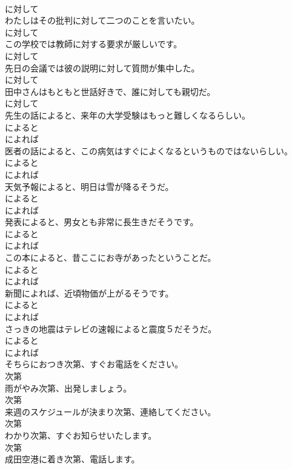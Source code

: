 \documentclass[8pt]{extreport}
\begin{document}
\begin{CJK}{UTF8}{min}
\\	に対して
\\	わたしはその批判に対して二つのことを言いたい。	
\\	に対して
\\	この学校では教師に対する要求が厳しいです。	
\\	に対して
\\	先日の会議では彼の説明に対して質問が集中した。	
\\	に対して
\\	田中さんはもともと世話好きで、誰に対しても親切だ。	
\\	に対して
\\	先生の話によると、来年の大学受験はもっと難しくなるらしい。	
\\	によると 
\\	によれば
\\	医者の話によると、この病気はすぐによくなるというものではないらしい。	
\\	によると 
\\	によれば
\\	天気予報によると、明日は雪が降るそうだ。	
\\	によると 
\\	によれば
\\	発表によると、男女とも非常に長生きだそうです。	
\\	によると 
\\	によれば
\\	この本によると、昔ここにお寺があったということだ。	
\\	によると 
\\	によれば
\\	新聞によれば、近頃物価が上がるそうです。	
\\	によると 
\\	によれば
\\	さっきの地震はテレビの速報によると震度５だそうだ。	
\\	によると 
\\	によれば
\\	そちらにおつき次第、すぐお電話をください。	
\\	次第
\\	雨がやみ次第、出発しましょう。	
\\	次第
\\	来週のスケジュールが決まり次第、連絡してください。	
\\	次第
\\	わかり次第、すぐお知らせいたします。	
\\	次第
\\	成田空港に着き次第、電話します。	

\end{CJK}
\end{document}
